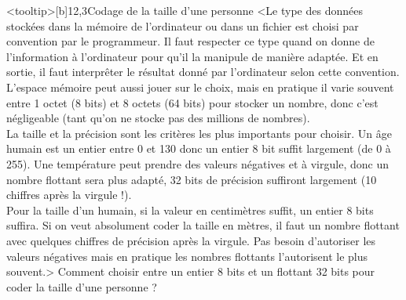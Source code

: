 \begin{quiz}[title={Organisation des données}]
\begin{quizquestion*}<tooltip>[b]{1}{2,3}{Codage de la taille d'une personne}
<Le type des données stockées dans la mémoire de l'ordinateur ou dans un fichier est choisi par convention par le programmeur. Il faut respecter ce type quand on donne de l'information à l'ordinateur pour qu'il la manipule de manière adaptée. Et en sortie, il faut interprêter le résultat donné par l'ordinateur selon cette convention.\\
L'espace mémoire peut aussi jouer sur le choix, mais en pratique il varie souvent entre 1 octet (8 bits) et 8 octets (64 bits) pour stocker un nombre, donc c'est négligeable (tant qu'on ne stocke pas des millions de nombres).\\
La taille et la précision sont les critères les plus importants pour choisir. Un âge humain est un entier entre 0 et 130 donc un entier 8 bit suffit largement (de 0 à 255). Une température peut prendre des valeurs négatives et à virgule, donc un nombre flottant sera plus adapté, 32 bits de précision suffiront largement (10 chiffres après la virgule !).\\
Pour la taille d'un humain, si la valeur en centimètres suffit, un entier 8 bits suffira. Si on veut absolument coder la taille en mètres, il faut un nombre flottant avec quelques chiffres de précision après la virgule. Pas besoin d'autoriser les valeurs négatives mais en pratique les nombres flottants l'autorisent le plus souvent.>
Comment choisir entre un entier 8 bits et un flottant 32 bits pour coder la taille d'une personne ?
\end{quizquestion*}


\end{quiz}
